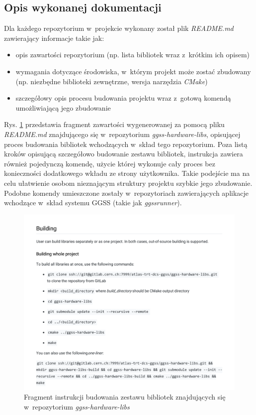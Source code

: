 \newpage

\subsection{Opis wykonanej dokumentacji}
Dla każdego repozytorium w~projekcie wykonany został plik \textit{README.md} zawierający informacje takie jak:
\begin{itemize}
\item opis zawartości repozytorium (np. lista bibliotek wraz z~krótkim ich opisem)
\item wymagania dotyczące środowiska, w~którym projekt może zostać zbudowany (np. niezbędne biblioteki zewnętrzne, wersja narzędzia \textit{CMake})
\item szczegółowy opis procesu budowania projektu wraz z~gotową komendą umożliwiającą jego zbudowanie 
\end{itemize}

Rys. \ref{fig:markdownHardware} przedstawia fragment zawartości wygenerowanej za pomocą pliku \textit{README.md} znajdującego się w~repozytorium \textit{ggss-hardware-libs}, opisującej proces budowania bibliotek wchodzących w~skład tego repozytorium. Poza listą kroków opisującą szczegółowo budowanie zestawu bibliotek, instrukcja zawiera również pojedynczą komendę, użycie której wykonuje cały proces bez konieczności dodatkowego wkładu ze strony użytkownika. Takie podejście ma na celu ułatwienie osobom nieznającym struktury projektu szybkie jego zbudowanie. Podobne komendy umieszczone zostały w~repozytoriach zawierających aplikacje wchodzące w~skład systemu GGSS (takie jak \textit{ggssrunner}).

\begin{figure}
\centering
\includegraphics[width=\textwidth]{res/HardwareLibs}
\caption{Fragment instrukcji budowania zestawu bibliotek znajdujących się w~repozytorium \textit{ggss-hardware-libs}}
\label{fig:markdownHardware}
\end{figure}

